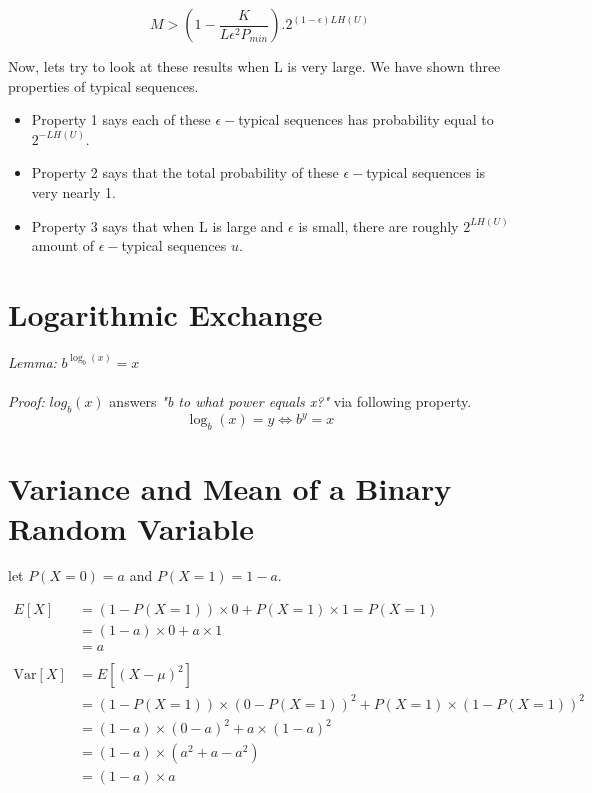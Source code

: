 \documentclass[11pt]{article}
\begin{document}
\begin{equation}
M > (1 - \frac{K}{L \epsilon^{2}P_{min}}) . 2 ^ {(1 - \epsilon)LH(U)}
\end{equation}

Now, lets try to look at these results when L is very large.  We have shown
three properties of typical sequences.

\begin{itemize}
\item Property 1 says each of these $\epsilon-$typical sequences has probability equal to $2^{-LH(U)}$.
\item Property 2 says that the total probability of these $\epsilon-$typical sequences is very nearly 1.
\item Property 3 says that when L is large and $\epsilon$ is small, there are roughly $2^{LH(U)}$ amount of $\epsilon-$typical sequences $u$.
\end{itemize}

\begin{appendices}
\section{Logarithmic Exchange}
\textit{Lemma:} $b^{\log_{b}(x)} = x$
\\ \\
\textit{Proof:} $log_{b}(x)$ answers \textit{"b to what power equals x?"} via following property.
\begin{equation}
\log_{b}(x) = y \Leftrightarrow b^{y} = x
\end{equation}
\section{Variance and Mean of a Binary Random Variable}

let $P(X=0) = a$ and $P(X=1) = 1 - a$.

\begin{equation} \label{mean_x}
\begin{split}
E[X] & = (1 - P(X=1)) \times 0 + P(X=1) \times 1 = P(X=1) \\
& = (1 - a) \times 0 + a \times 1 \\
& = a \\ \\
\mathrm{Var}[X] & = E[(X-\mu)^2] \\
& = (1 - P(X=1)) \times (0 - P(X=1))^2 + P(X=1) \times (1 - P(X=1))^2\\
& = (1 - a) \times (0 - a)^2 + a \times (1 - a)^2 \\
& = (1 - a) \times (a^2 +a - a^2) \\
& = (1 - a) \times a
\end{split}
\end{equation}

\end{appendices}
\end{document}
